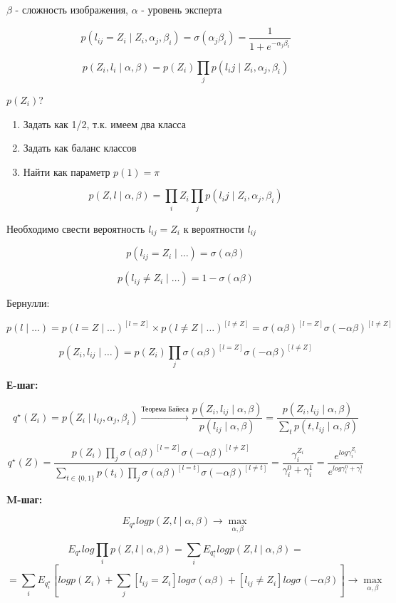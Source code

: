 \documentclass[a4paper, 12pt]{article}
\begin{document}
$\beta$ - сложность изображения, $\alpha$ - уровень эксперта

\[p(l_{ij} = Z_i \mid Z_i, \alpha_j, \beta_i) = \sigma(\alpha_j \beta_i) 
= \frac{1}{1 + e^{-\alpha_j \beta_i}}\]

\[p(Z_i, l_i \mid \alpha, \beta) = 
p(Z_i) \prod_{j} p(l_ij \mid Z_i, \alpha_j, \beta_i)\]

\(p(Z_i)\)?

\begin{enumerate}
    \item Задать как 1/2, т.к. имеем два класса
    \item Задать как баланс классов
    \item Найти как параметр \(p(1) = \pi\)
\end{enumerate}

\[p(Z, l \mid \alpha, \beta) = 
\prod_i Z_i \prod_{j} p(l_ij \mid Z_i, \alpha_j, \beta_i)\]

Необходимо свести вероятность $l_{ij} = Z_i$ к вероятности $l_{ij}$

\[p(l_{ij} = Z_i \mid \ldots) = \sigma(\alpha\beta)\]

\[p(l_{ij} \neq Z_i \mid \ldots) = 1 - \sigma(\alpha\beta)\]

Бернулли:

\[p(l \mid \ldots) = p(l = Z \mid \ldots)^{[l = Z]} 
\times p(l \neq Z \mid \ldots)^{[l \neq Z]} =
\sigma(\alpha\beta)^{[l = Z]}\sigma(-\alpha\beta)^{[l \neq Z]}\]

\[p(Z_i, l_{ij} \mid \ldots) = 
p(Z_i)\prod_{j}\sigma(\alpha\beta)^{[l = Z]}
\sigma(-\alpha\beta)^{[l \neq Z]}\]

\textbf{Е-шаг:}

\[q^{\star}(Z_i) = p(Z_i \mid l_{ij}, \alpha_j, \beta_i) 
\xrightarrow{\textrm{Теорема Байеса}} \frac{p(Z_i, l_{ij}\mid\alpha,\beta)}
{p(l_{ij}\mid\alpha,\beta)} = \frac{p(Z_i, l_{ij}\mid\alpha,\beta)}
{\sum_{t} p(t, l_{ij}\mid\alpha,\beta)}\]

\[q^{\star}(Z) = \frac{p(Z_i)
\prod_{j}\sigma(\alpha\beta)^{[l = Z]}
\sigma(-\alpha\beta)^{[l \neq Z]}}
{\sum_{t \in \{0, 1\}} p(t_i)
\prod_{j}\sigma(\alpha\beta)^{[l = t]}
\sigma(-\alpha\beta)^{[l \neq t]}} 
= \frac{\gamma^{Z_i}_i}{\gamma^{0}_i + \gamma^{1}_i} = 
\frac{e^{log\gamma^{Z_i}_i}}
{e^{log\gamma^{0}_i + \gamma^{1}_i}}\]

\textbf{M-шаг:}

\[E_{q^{\star}} log p(Z, l \mid \alpha, \beta) 
\rightarrow \max_{\alpha, \beta}\]

\[E_{q^{\star}} log \prod_i p(Z, l \mid \alpha, \beta) = 
\sum_i E_{q^{\star}_i} logp(Z, l \mid \alpha, \beta) = \]
\[=\sum_i E_{q^{\star}_i}[logp(Z_i) + 
\sum_j [l_{ij} = Z_i] log \sigma(\alpha\beta) + 
[l_{ij} \neq Z_i] log \sigma(-\alpha\beta)] 
\rightarrow \max_{\alpha, \beta}\]
\end{document}
